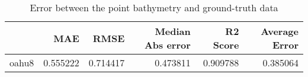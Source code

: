 \begin{table}[h!]
\caption{Error between the point bathymetry and ground-truth data}
\label{tab:oahu8_lidar_error}
\begin{tabular}{lrrrrr}
\toprule
 & MAE & RMSE & Median Abs error & R2 Score & Average Error \\
\midrule
oahu8 & 0.555222 & 0.714417 & 0.473811 & 0.909788 & 0.385064 \\
\bottomrule
\end{tabular}
\end{table}
